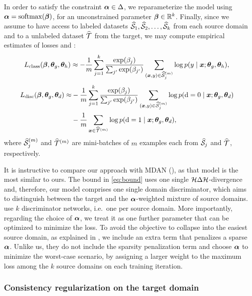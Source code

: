 In order to satisfy the constraint ${\bm{\alpha}} \in \Delta$, we reparameterize the model using ${\bm{\alpha}} = \mathrm{softmax}({\bm{\beta}})$, for an unconstrained parameter ${\bm{\beta}} \in {\mathbb{R}}^k$. Finally, since we assume to have access to labeled datasets $\widehat{{\mathcal{S}}}_1,\widehat{{\mathcal{S}}}_2,\dots,\widehat{{\mathcal{S}}}_k$ from each source domain and to a unlabeled dataset $\widehat{{\mathcal{T}}}$ from the target, we may compute empirical estimates of losses  and :
\begin{equation}
    \label{eq:emp_loss_class}
    L_\text{class}({\bm{\beta}}, {\bm{\theta}}_g, {\bm{\theta}}_h) \approx -\frac{1}{m}\sum_{j=1}^k \frac{\exp({\beta}_j)}{\sum_{j'} \exp({\beta}_{j'})} \sum_{({\bm{x}},y) \in \widehat{{\mathcal{S}}}_j^{(m)}} \log p(y \mid {\bm{x}}; {\bm{\theta}}_g, {\bm{\theta}}_h),
\end{equation}
\begin{align}
    \label{eq:emp_loss_disc}
    L_\text{disc}({\bm{\beta}}, {\bm{\theta}}_g, {\bm{\theta}}_d) \approx& -\frac{1}{m}\sum_{j=1}^k \frac{\exp({\beta}_j)}{\sum_{j'} \exp({\beta}_{j'})} \sum_{({\bm{x}},y) \in \widehat{{\mathcal{S}}}_j^{(m)}} \log p({\textnormal{d}}=0 \mid {\bm{x}}; {\bm{\theta}}_g, {\bm{\theta}}_d) \\
    &-\frac{1}{m}\sum_{{\bm{x}} \in \widehat{{\mathcal{T}}}^{(m)}} \log p({\textnormal{d}}=1 \mid {\bm{x}}; {\bm{\theta}}_g, {\bm{\theta}}_d), \nonumber
\end{align}
where $\widehat{{\mathcal{S}}}_j^{(m)}$ and $\widehat{{\mathcal{T}}}^{(m)}$ are mini-batches of $m$ examples each from $\widehat{{\mathcal{S}}}_j$ and $\widehat{{\mathcal{T}}}$, respectively.

It is instructive to compare our approach with MDAN (\citet{Zhao2018}), as that model is the most similar to ours. The bound in \eqref{eq:bound} uses one single ${\mathcal{H}} \Delta {\mathcal{H}}$-divergence and, therefore, our model comprises one single domain discriminator, which aims to distinguish between the target and the ${\bm{\alpha}}$-weighted mixture of source domains. \citet{Zhao2018} use $k$ discriminator networks, i.e.\ one per source domain. More importantly, regarding the choice of ${\bm{\alpha}}$, we treat it as one further parameter that can be optimized to minimize the loss. To avoid the objective to collapse into the easiest source domain, as explained in , we include an extra term that penalizes a sparse ${\bm{\alpha}}$. Unlike us, they do not include the sparsity penalization term and choose ${\bm{\alpha}}$ to minimize the worst-case scenario, by assigning a larger weight to the maximum loss among the $k$ source domains on each training iteration.

\subsubsection{Consistency regularization on the target domain}
\label{sec:modafm_consistency}

